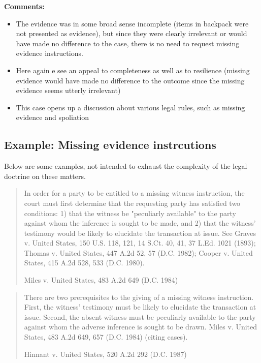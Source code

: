 \documentclass[
  10pt,
  dvipsnames,enabledeprecatedfontcommands]{scrartcl}
\begin{document}
\textbf{Comments:}

\begin{itemize}
\item
  The evidence was in some broad sense incomplete (items in backpack
  were not presented as evidence), but since they were clearly
  irrelevant or would have made no difference to the case, there is no
  need to request missing evidence instructions.
\item
  Here again e see an appeal to completeness as well as to resilience
  (missing evidence would have made no difference to the outcome since
  the missing evidence seems utterly irrelevant)
\item
  This case opens up a discussion about various legal rules, such as
  missing evidence and spoliation
\end{itemize}


\hypertarget{example-missing-evidence-instrcutions}{%
\subsection{Example: Missing evidence
instrcutions}\label{example-missing-evidence-instrcutions}}

Below are some examples, not intended to exhaust the complexity of the
legal doctrine on these matters.

\begin{quote}
In order for a party to be entitled to a missing witness instruction, the court must first determine that the requesting party has satisfied two conditions: 1) that the witness be "peculiarly available" to the party against whom the inference is sought to be made, and 2) that the witness' testimony would be likely to elucidate the transaction at issue. See Graves v. United States, 150 U.S. 118, 121, 14 S.Ct. 40, 41, 37 L.Ed. 1021 (1893); Thomas v. United States, 447 A.2d 52, 57 (D.C. 1982); Cooper  v. United States, 415 A.2d 528, 533 (D.C. 1980).

Miles v. United States, 483 A.2d 649 (D.C. 1984)
\end{quote}

\begin{quote}
There are two prerequisites to the giving of a missing witness instruction. First, the witness' testimony must be likely to elucidate the transaction at issue. Second, the absent witness must be peculiarly available to the party against whom the adverse inference is sought to be drawn. Miles v. United States, 483 A.2d 649, 657 (D.C. 1984) (citing cases).

Hinnant v. United States, 520 A.2d 292 (D.C. 1987)
\end{quote}
\end{document}
